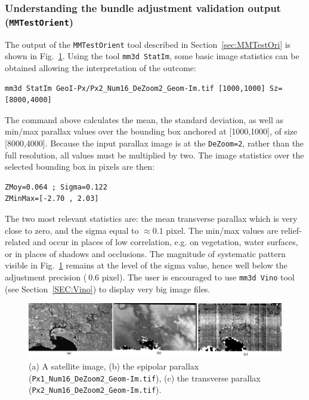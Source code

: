\subsubsection*{Understanding the bundle adjustment validation output ({\tt MMTestOrient})}
% 
The output of the {\tt MMTestOrient} tool described in Section~\ref{sec:MMTestOri} is shown in Fig.~\ref{fig:satMMTestOri}. Using the tool {\tt mm3d StatIm}, some basic image statistics can be obtained allowing the interpretation of the outcome:
\begin{verbatim}
mm3d StatIm GeoI-Px/Px2_Num16_DeZoom2_Geom-Im.tif [1000,1000] Sz=[8000,4000]
\end{verbatim}
%
The command above calculates the mean, the standard deviation, as well as min/max parallax values over the bounding box anchored at [1000,1000], of size [8000,4000]. Because the input parallax image is at the \texttt{DeZoom=2}, rather than the full resolution, all values must be multiplied by two. The image statistics over the selected bounding box in pixels are then:
\begin{verbatim}
ZMoy=0.064 ; Sigma=0.122
ZMinMax=[-2.70 , 2.03]
\end{verbatim}
%   
The two most relevant statistics are: the mean transverse parallax which is very close to zero, and the sigma equal to $\approx 0.1$ pixel. The min/max values are relief-related and occur in places of low correlation, e.g. on vegetation, water surfaces, or in places of shadows and occlusions. The magnitude of systematic pattern visible in Fig.~\ref{fig:satMMTestOri} remains at the level of the sigma value, hence well below the adjustment precision ($~0.6$ pixel). The user is encouraged to use \texttt{mm3d Vino} tool (see Section~\ref{SEC:Vino}) to display very big image files.
%
\begin{figure}[h!]
\centering
\includegraphics[width=0.95\linewidth]{FIGS/Satellites/IMG_Px1_Px2_Num16.png}
\caption{(a) A satellite image, (b) the epipolar parallax (\texttt{Px1\_Num16\_DeZoom2\_Geom-Im.tif}), (c) the transverse parallax (\texttt{Px2\_Num16\_DeZoom2\_Geom-Im.tif}).}
\label{fig:satMMTestOri}
\end{figure}




